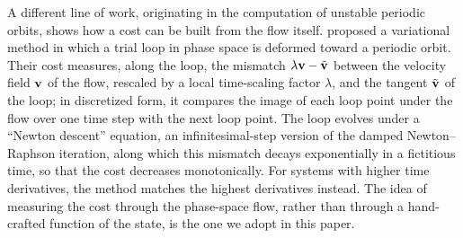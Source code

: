 A different line of work, originating in the computation of unstable periodic orbits, shows how a
cost can be built from the flow itself.
\citet{lan2004variational} proposed a variational method in which a trial loop in phase space is
deformed toward a periodic orbit.
Their cost measures, along the loop, the mismatch $\lambda\mathbf{v} - \tilde{\mathbf{v}}$ between the velocity
field $\mathbf{v}$ of the flow, rescaled by a local time-scaling factor $\lambda$, and the tangent
$\tilde{\mathbf{v}}$ of the loop; in discretized form, it compares the image of each loop point under
the flow over one time step with the next loop point.
The loop evolves under a ``Newton descent'' equation, an infinitesimal-step version of the damped
Newton--Raphson iteration, along which this mismatch decays exponentially in a fictitious time,
so that the cost decreases monotonically.
For systems with higher time derivatives, the method matches the highest derivatives instead.
The idea of measuring the cost through the phase-space flow, rather than through a hand-crafted
function of the state, is the one we adopt in this paper.

